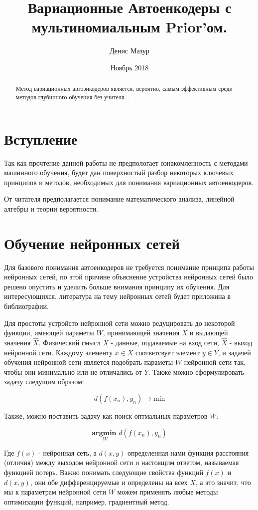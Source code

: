 \documentclass{article}
\title{Вариационные Автоенкодеры с мультиномиальным Prior'ом.}
\author{Денис Мазур}
\date{Ноябрь 2018}
\begin{document}
\maketitle

\begin{abstract}
    Метод вариационных автоэнкодеров является, вероятно, самым эффективным
    среди методов глубинного обучения без учителя...
\end{abstract}

\section{Вступление}
Так как прочтение данной работы не предпологает ознакомленность с методами машинного обучения, будет дан поверхностый разбор некоторых ключевых принципов и методов,
необходимых для понимания вариационных автоенкодеров. 

От читателя предполагается понимание математического анализа, линейной алгебры и теории вероятности.

\section{Обучение нейронных сетей}
Для базового понимания автоенкодеров не требуется понимание принципа работы нейронных сетей, по этой причине объяснение устройства нейронных сетей было решено опустить 
и уделить больше внимания принципу их обучения. Для интересующихся, литература на тему нейронных сетей будет приложина в библиографии.

Для простоты устройсто нейронной сети можно редуцировать до некоторой функции, имеющей параметы $W$, принимающей значения $X$ и выдающей значения $\widehat{X}$. 
Физический смысл $X$ - данные, подаваемые на вход сети, $\widehat{X}$ - выход нейронной сети. Каждому элементу $x \in X$ соответсвует элемент $y \in Y$, и задачей обучения
нейронной сети является подобрать параметы $W$ нейронной сети так, чтобы они минимально или не отличались от $Y$. Также можно сформулировать задачу следущим образом:

$$d(f(x_n), y_n) \rightarrow \text{min}$$

Также, можно поставить задачу как поиск оптмальных параметров $W$:

$$\underset{W}{\textbf{argmin }} d(f(x_n), y_n)$$ 

Где $f(x)$ - нейронная сеть, а $d(x, y)$ определенная нами функция расстояния (отличия) между выходом нейронной сети и настоящим ответом, называемая функцией потерь.
Важно понимать следующие свойства функций $f(x)$ и $d(x, y)$, они обе дифференцируемые и определены на всех $X$, а это значит, что мы к параметрам нейронной сети $W$ можем
применять любые методы оптимизации функций, например, градиентный метод.
\end{document}
